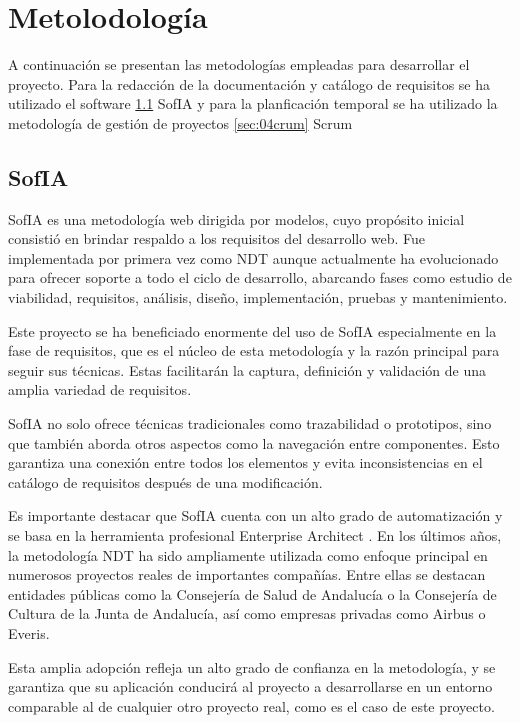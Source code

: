 \chapter{Metolodología}\label{cap:04metodologia}

A continuación se presentan las metodologías empleadas para desarrollar el proyecto. Para la redacción de la documentación y catálogo de requisitos se ha utilizado el software \ref{sec:04sofia} SofIA y para la planficación temporal se ha utilizado la metodología de gestión de proyectos \ref{sec:04crum} Scrum


\section{SofIA} \label{sec:04sofia} %

SofIA \cite{escalona2023} es una metodología web dirigida por modelos, cuyo propósito inicial consistió en brindar respaldo a los requisitos del desarrollo web. Fue implementada por primera vez como NDT aunque actualmente ha evolucionado para ofrecer soporte a todo el ciclo de desarrollo, abarcando fases como estudio de viabilidad, requisitos, análisis, diseño, implementación, pruebas y mantenimiento.

Este proyecto se ha beneficiado enormente del uso de SofIA especialmente en la fase de requisitos, que es el núcleo de esta metodología y la razón principal para seguir sus técnicas. Estas facilitarán la captura, definición y validación de una amplia variedad de requisitos.

SofIA no solo ofrece técnicas tradicionales como trazabilidad o prototipos, sino que también aborda otros aspectos como la navegación entre componentes. Esto garantiza una conexión entre todos los elementos y evita inconsistencias en el catálogo de requisitos después de una modificación.

Es importante destacar que SofIA cuenta con un alto grado de automatización y se basa en la herramienta profesional Enterprise Architect \cite{licenciaEA}. En los últimos años, la metodología NDT ha sido ampliamente utilizada como enfoque principal en numerosos proyectos reales de importantes compañías. Entre ellas se destacan entidades públicas como la Consejería de Salud de Andalucía o la Consejería de Cultura de la Junta de Andalucía, así como empresas privadas como Airbus o Everis. 

Esta amplia adopción refleja un alto grado de confianza en la metodología, y se garantiza que su aplicación conducirá al proyecto a desarrollarse en un entorno comparable al de cualquier otro proyecto real, como es el caso de este proyecto.

